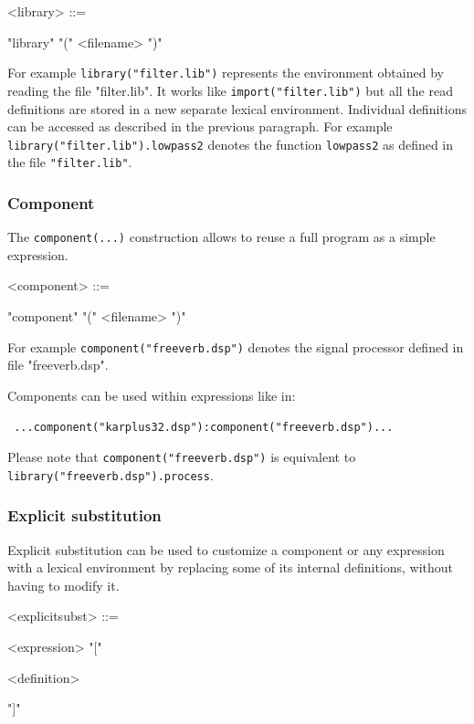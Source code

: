 \documentclass[a4paper,10pt]{book}
\begin{document}
\begin{grammar}
  <library> ::= 
  \begin{syntdiag}
      "library" "(" <filename> ")"
  \end{syntdiag}
\end{grammar}

For example \lstinline'library("filter.lib")' represents the environment 
obtained by reading the file "filter.lib". It works like \lstinline'import("filter.lib")' but all the read definitions are stored in a new separate lexical environment. Individual definitions can be accessed as described in the previous paragraph. For example \lstinline'library("filter.lib").lowpass2' denotes the function \lstinline'lowpass2' as defined in the file \lstinline'"filter.lib"'.


\subsubsection{Component} 
The \lstinline'component(...)' construction allows to reuse a full \faust program as a simple expression.

\begin{grammar}
  <component> ::= 
  \begin{syntdiag}
    "component" "(" <filename> ")"
  \end{syntdiag}
\end{grammar}

 For example \lstinline'component("freeverb.dsp")' denotes the signal processor defined in file "freeverb.dsp". 
 
 Components can be used within expressions like in: 
 \begin{lstlisting}
 ...component("karplus32.dsp"):component("freeverb.dsp")... 
 \end{lstlisting}
 
 Please note that \lstinline'component("freeverb.dsp")' is equivalent to \lstinline'library("freeverb.dsp").process'.


\subsubsection{Explicit substitution} 

Explicit substitution can be used to customize a component or any expression with a lexical environment by replacing some of its internal definitions, without having to modify it.

\begin{grammar}
  <explicitsubst> ::= 
  \begin{syntdiag}
      <expression> "["
        \begin{rep}
          <definition>
        \end{rep}
        "]"
  \end{syntdiag}
\end{grammar}
\end{document}
